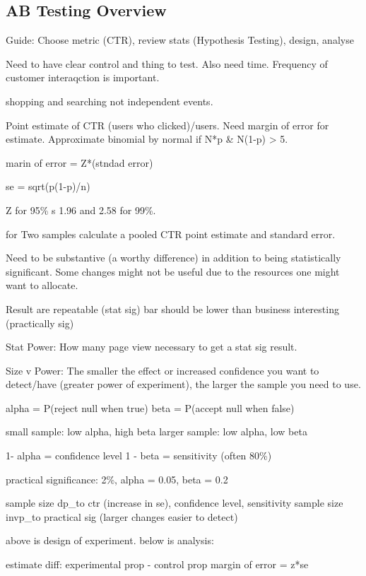 \documentclass[]{book}
\begin{document}
\subsection{AB Testing Overview}\label{ab-testing-overview}

Guide: Choose metric (CTR), review stats (Hypothesis Testing), design,
analyse

Need to have clear control and thing to test. Also need time. Frequency
of customer interaqction is important.

shopping and searching not independent events.

Point estimate of CTR (users who clicked)/users. Need margin of error
for estimate. Approximate binomial by normal if N*p \& N(1-p)
\textgreater{} 5.

marin of error = Z*(stndad error)

se = sqrt(p(1-p)/n)

Z for 95\% s 1.96 and 2.58 for 99\%.

for Two samples calculate a pooled CTR point estimate and standard
error.

Need to be substantive (a worthy difference) in addition to being
statistically significant. Some changes might not be useful due to the
resources one might want to allocate.

Result are repeatable (stat sig) bar should be lower than business
interesting (practically sig)

Stat Power: How many page view necessary to get a stat sig result.

Size v Power: The smaller the effect or increased confidence you want to
detect/have (greater power of experiment), the larger the sample you
need to use.

alpha = P(reject null when true) beta = P(accept null when false)

small sample: low alpha, high beta larger sample: low alpha, low beta

1- alpha = confidence level 1 - beta = sensitivity (often 80\%)

practical significance: 2\%, alpha = 0.05, beta = 0.2

sample size dp\_to ctr (increase in se), confidence level, sensitivity
sample size invp\_to practical sig (larger changes easier to detect)

above is design of experiment. below is analysis:

estimate diff: experimental prop - control prop margin of error = z*se
\end{document}
